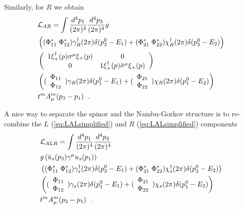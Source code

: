 \documentclass[10pt, aps, prd, superscriptaddress, nofootinbib, 
               amsmath, amssymb, twocolumn,
               preprintnumbers, showpacs,
               raggedbottom,
               floatfix]{revtex4-1}
\newcommand{\calL}{{\cal{L}}}
\newcommand{\bsigma}{{\bar{\sigma}}}
\begin{document}
Similarly, for $R$ we obtain
\begin{equation}
\begin{split}
&\calL_{AR}=\int \frac{d^4p_1}{(2\pi)^4} \frac{d^4p_3}{(2\pi)^4} {g}\\
&
\left(
  (\Phi^*_{11}\;\Phi^*_{12})\gamma_R^\dagger(2\pi)\delta(p_3^0-E_1)+
  (\Phi^*_{21}\;\Phi^*_{22})\chi_R^\dagger(2\pi)\delta(p_3^0-E_2)\right)  \\
  &
   \left(\begin{array}{cc}
   1\xi_{+}^\dagger(p)\sigma^\mu \xi_{+}(p) & 0\\
   0 & 1\xi_{+}^\dagger(p)\bsigma^{\mu} \xi_{+}(p)\\
  \end{array}
  \right)\\
&\left((\begin{array}{c}\Phi_{11}\\ \Phi_{12}\end{array})\gamma_R(2\pi)\delta(p_1^0-E_1)
      +(\begin{array}{c}\Phi_{21}\\ \Phi_{22}\end{array})\chi_R(2\pi)\delta(p_1^0-E_2)
      \right)\\
&      
t^m A^m_{\mu}(p_3-p_1)~\label{eq:LARsimplified}\;.
\end{split}
\end{equation}

A nice way to separate the spinor and the Nambu-Gorkov structure is to re-combine
the $L$ (\ref{eq:LALsimplified}) and $R$ (\ref{eq:LALsimplified}) components 
\begin{equation}
\begin{split}
&\calL_{ALR}=\int \frac{d^4p_1}{(2\pi)^4} \frac{d^4p_3}{(2\pi)^4} \\
&
{g}\left(\bar{u}_s(p_3)\gamma^\mu u_s(p_1)
  \right)\\
& \left(
  (\Phi^*_{11}\;\Phi^*_{12})\gamma_s^\dagger(2\pi)\delta(p_3^0-E_1)+
  (\Phi^*_{21}\;\Phi^*_{22})\chi_s^\dagger(2\pi)\delta(p_3^0-E_2)\right)  \\
&\left((\begin{array}{c}\Phi_{11}\\ \Phi_{12}\end{array})\gamma_s(2\pi)\delta(p_1^0-E_1)
      +(\begin{array}{c}\Phi_{21}\\ \Phi_{22}\end{array})\chi_s(2\pi)\delta(p_1^0-E_2)
      \right)\\
&      
t^mA_{\mu}^m(p_3-p_1)~\label{eq:LALRsimplified}\;.
\end{split}
\end{equation}
\end{document}
